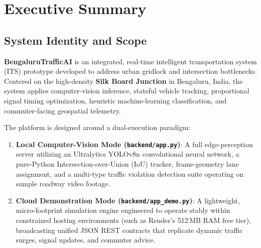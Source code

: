 \chapter{Executive Summary}

\section{System Identity and Scope}
\textbf{BengaluruTrafficAI} is an integrated, real-time intelligent transportation system (ITS) prototype developed to address urban gridlock and intersection bottlenecks. Centered on the high-density \textbf{Silk Board Junction} in Bengaluru, India, the system applies computer-vision inference, stateful vehicle tracking, proportional signal timing optimization, heuristic machine-learning classification, and commuter-facing geospatial telemetry.

The platform is designed around a dual-execution paradigm:
\begin{enumerate}[leftmargin=*]
    \item \textbf{Local Computer-Vision Mode (\texttt{backend/app.py})}: A full edge-perception server utilizing an Ultralytics YOLOv8n convolutional neural network, a pure-Python Intersection-over-Union (IoU) tracker, frame-geometry lane assignment, and a multi-type traffic violation detection suite operating on sample roadway video footage.
    \item \textbf{Cloud Demonstration Mode (\texttt{backend/app\_demo.py})}: A lightweight, micro-footprint simulation engine engineered to operate stably within constrained hosting environments (such as Render's 512\,MB RAM free tier), broadcasting unified JSON REST contracts that replicate dynamic traffic surges, signal updates, and commuter advice.
\end{enumerate}

